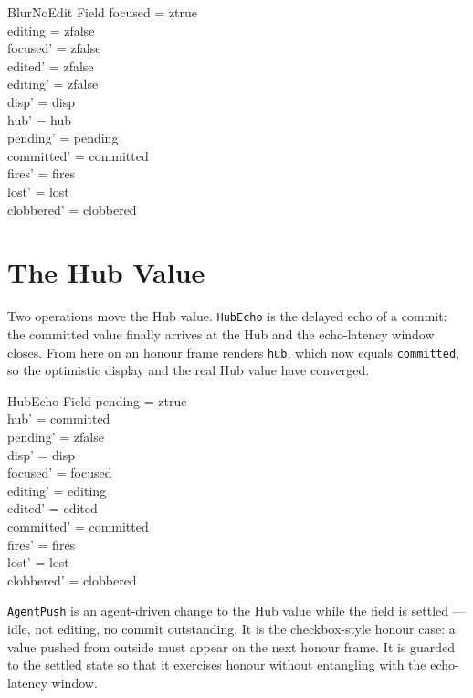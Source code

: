 \documentclass[a4paper,10pt,fleqn]{article}
\begin{document}
\begin{schema}{BlurNoEdit}
  \Delta Field
\where
  focused = ztrue \\
  editing = zfalse \\
  focused' = zfalse \\
  edited' = zfalse \\
  editing' = zfalse \\
  disp' = disp \\
  hub' = hub \\
  pending' = pending \\
  committed' = committed \\
  fires' = fires \\
  lost' = lost \\
  clobbered' = clobbered
\end{schema}

\section{The Hub Value}

Two operations move the Hub value.  \texttt{HubEcho} is the delayed echo of a
commit: the committed value finally arrives at the Hub and the echo-latency
window closes.  From here on an honour frame renders \texttt{hub}, which now
equals \texttt{committed}, so the optimistic display and the real Hub value have
converged.

\begin{schema}{HubEcho}
  \Delta Field
\where
  pending = ztrue \\
  hub' = committed \\
  pending' = zfalse \\
  disp' = disp \\
  focused' = focused \\
  editing' = editing \\
  edited' = edited \\
  committed' = committed \\
  fires' = fires \\
  lost' = lost \\
  clobbered' = clobbered
\end{schema}

\texttt{AgentPush} is an agent-driven change to the Hub value while the field is
settled --- idle, not editing, no commit outstanding.  It is the checkbox-style
honour case: a value pushed from outside must appear on the next honour frame.
It is guarded to the settled state so that it exercises honour without
entangling with the echo-latency window.
\end{document}
